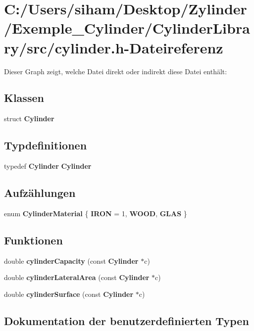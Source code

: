 \section{C:/Users/siham/Desktop/Zylinder/Exemple\_\-Cylinder/Cylinder\-Library/src/cylinder.h-Dateireferenz}
\label{src_2cylinder_8h}


Dieser Graph zeigt, welche Datei direkt oder indirekt diese Datei enth\"{a}lt:\subsection*{Klassen}
\begin{CompactItemize}
\item 
struct {\bf Cylinder}
\end{CompactItemize}
\subsection*{Typdefinitionen}
\begin{CompactItemize}
\item 
typedef {\bf Cylinder} {\bf Cylinder}
\end{CompactItemize}
\subsection*{Aufz\"{a}hlungen}
\begin{CompactItemize}
\item 
enum {\bf Cylinder\-Material} \{ {\bf IRON} =  1, 
{\bf WOOD}, 
{\bf GLAS}
 \}
\end{CompactItemize}
\subsection*{Funktionen}
\begin{CompactItemize}
\item 
double {\bf cylinder\-Capacity} (const {\bf Cylinder} $\ast$c)
\item 
double {\bf cylinder\-Lateral\-Area} (const {\bf Cylinder} $\ast$c)
\item 
double {\bf cylinder\-Surface} (const {\bf Cylinder} $\ast$c)
\end{CompactItemize}


\subsection{Dokumentation der benutzerdefinierten Typen}
